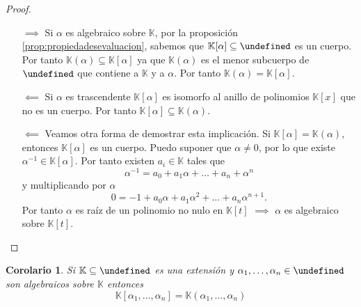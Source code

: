 \documentclass[10pt, spanish]{report}
\newtheorem{cor}{Corolario}[tma]
\theoremstyle{definition}
\newcommand{\K}{\mathbb{K}}
\let\L\undefined
\newcommand{\L}{\mathbb{L}}
\newcommand{\fecha}[1]{\marginpar{\underline{\footnotesize{#1}}}}
\begin{document}
\fecha{23/02}
\begin{proof}\hspace{1em}
    \begin{itemize}[itemindent=14pt]
        \item[$\implies$]  Si $\alpha$ es algebraico sobre $\K$, por la proposición
            \ref{prop:propiedadesevaluacion}, sabemos que
            $\K[\alpha]\subseteq\L$ es un cuerpo. Por tanto
            $\K(\alpha)\subseteq\K[\alpha]$ ya que $\K(\alpha)$ es el menor
            subcuerpo de $\L$ que contiene a $\K$ y a $\alpha$. Por tanto
            $\K(\alpha)=\K[\alpha]$.
        \item[$\impliedby$]  Si $\alpha$ es trascendente $\K[\alpha]$ es
            isomorfo al anillo de polinomios $\K[x]$ que no es un cuerpo. Por
            tanto $\K[\alpha]\subseteq\K(\alpha)$.
        \item[$\impliedby$] Veamos otra forma de demostrar esta implicación. Si
            $\K[\alpha]=\K(\alpha)$, entonces $\K[\alpha]$ es un cuerpo. Puedo
            suponer que $\alpha\neq0$, por lo que existe $\alpha^{-1}\in
            \K[\alpha]$. Por tanto existen $a_i\in \K$ tales que
            \[\alpha^{-1}=a_0+a_1\alpha+\ldots+a_n+\alpha^n\] y multiplicando
            por $\alpha$ \[0=-1+a_0\alpha+a_1\alpha^2+\ldots+a_n\alpha^{n+1}.\]
            Por tanto $\alpha$ es raíz de un polinomio no nulo en $\K[t]$
            $\implies$
            $\alpha$ es algebraico sobre $\K[t]$.
    \end{itemize}
    \vspace{-1.75em}
\end{proof}

\begin{cor}
    Si $\K\subseteq\L$ es una extensión y $\alpha_1,\ldots,\alpha_n\in\L$ son
    algebraicos sobre $\K$ entonces \[\K[\alpha_1,\ldots,\alpha_n]=
    \K(\alpha_1,\ldots,\alpha_n)\]
\end{cor}
\end{document}
